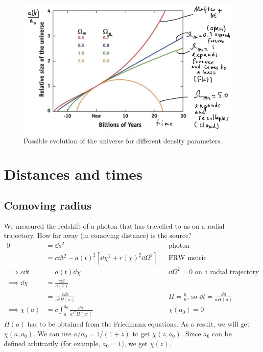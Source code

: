 \begin{figure}
	\centering
	\includegraphics[width=\textwidth]{img/ch-02/evolution.png}
	\caption{Possible evolution of the universe for different density parameters.}
	\label{fig:evolution}
\end{figure}




\section{Distances and times}



\subsection{Comoving radius}
We measured the redshift of a photon that has travelled to us on a radial trajectory. How far away (in comoving distance) is the source?
\begin{align*}
	0 &= \dd{s}^2 &&\text{photon}\\
	&= c \dd{t}^2 - a(t)^2 [\dd{\chi}^2 + r(\chi)^2 \dd{\Omega}^2] &&\text{FRW metric}\\
	\implies c \dd{t} &= a(t) \dd{\chi} &&\dd{\Omega}^2 = 0 \text{ on a radial trajectory}\\
	\implies \dd{\chi} &= \frac{c \dd{t}}{a(t)}\\
	&= \frac{c \dd{a}}{a^2 H(a)} && H = \frac{\dot{a}}{a} \text{, so } \dd{t} = \frac{\dd{a}}{a H(a)}\\
	\implies \chi(a) &= c \int_a^{a_0} \frac{\dd{a'}}{a'^2 H(a')} && \chi(a_0) = 0
\end{align*}
$H(a)$ has to be obtained from the Friedmann equations. As a result, we will get $\chi(a,a_0)$. We can use $a/a_0 = 1/(1+z)$ to get $\chi(z,a_0)$. Since $a_0$ can be defined arbitrarily (for example, $a_0=1$), we get $\chi(z)$.

